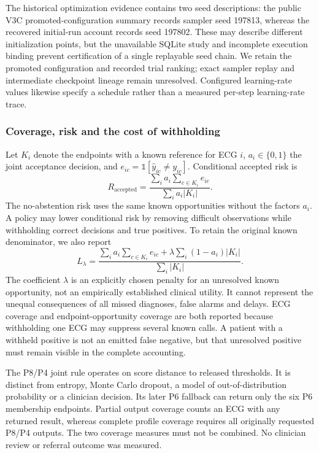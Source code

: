 The historical optimization evidence contains two seed descriptions: the public V3C promoted-configuration summary records sampler seed 197813, whereas the recovered initial-run account records seed 197802. These may describe different initialization points, but the unavailable SQLite study and incomplete execution binding prevent certification of a single replayable seed chain. We retain the promoted configuration and recorded trial ranking; exact sampler replay and intermediate checkpoint lineage remain unresolved. Configured learning-rate values likewise specify a schedule rather than a measured per-step learning-rate trace.

\subsubsection{Coverage, risk and the cost of withholding}
\label{sec:risk}
Let $K_i$ denote the endpoints with a known reference for ECG $i$, $a_i\in\{0,1\}$ the joint acceptance decision, and $e_{ic}=\mathbb{1}[\hat y_{ic}\ne y_{ic}]$. Conditional accepted risk is
\begin{equation}
R_{\mathrm{accepted}}=\frac{\sum_i a_i\sum_{c\in K_i}e_{ic}}{\sum_i a_i|K_i|}.
\label{eq:accepted-risk}
\end{equation}
The no-abstention risk uses the same known opportunities without the factors $a_i$. A policy may lower conditional risk by removing difficult observations while withholding correct decisions and true positives. To retain the original known denominator, we also report
\begin{equation}
L_\lambda=\frac{\sum_i a_i\sum_{c\in K_i}e_{ic}+\lambda\sum_i(1-a_i)|K_i|}{\sum_i|K_i|}.
\label{eq:withholding-cost}
\end{equation}
The coefficient $\lambda$ is an explicitly chosen penalty for an unresolved known opportunity, not an empirically established clinical utility. It cannot represent the unequal consequences of all missed diagnoses, false alarms and delays. ECG coverage and endpoint-opportunity coverage are both reported because withholding one ECG may suppress several known calls. A patient with a withheld positive is not an emitted false negative, but that unresolved positive must remain visible in the complete accounting.

The P8/P4 joint rule operates on score distance to released thresholds. It is distinct from entropy, Monte Carlo dropout, a model of out-of-distribution probability or a clinician decision. Its later P6 fallback can return only the six P6 membership endpoints. Partial output coverage counts an ECG with any returned result, whereas complete profile coverage requires all originally requested P8/P4 outputs. The two coverage measures must not be combined. No clinician review or referral outcome was measured.

